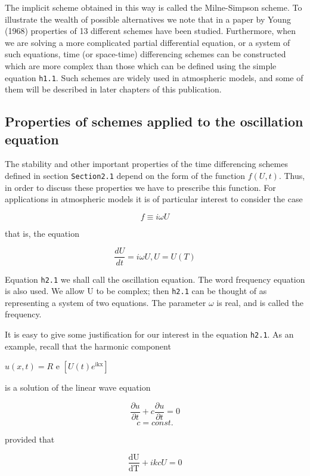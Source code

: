 The implicit scheme obtained in this way is called the Milne-Simpson
scheme. To illustrate the wealth of possible alternatives we note that
in a paper by Young (1968) properties of 13 different schemes have been
studied. Furthermore, when we are solving a more complicated partial
differential equation, or a system of such equations, time (or
space-time) differencing schemes can be constructed which are more
complex than those which can be defined using the simple equation
\texttt{h1.1}. Such schemes are widely used in atmospheric models, and
some of them will be described in later chapters of this publication.

\subsection{\texorpdfstring{\textbf{Properties of schemes applied to the
oscillation
equation}}{Properties of schemes applied to the oscillation equation}}\label{properties-of-schemes-applied-to-the-oscillation-equation}

The stability and other important properties of the time differencing
schemes defined in section \texttt{Section2.1} depend on the form of the
function \(f\left( U,t \right)\). Thus, in order to discuss these
properties we have to prescribe this function. For applications in
atmospheric models it is of particular interest to consider the case

\[f \equiv i\omega U\]

that is, the equation

{\[\frac{dU}{dt} = i\omega U, U = U\left( T \right)\]}

Equation \texttt{h2.1} we shall call the oscillation equation. The word
frequency equation is also used. We allow U to be complex; then
\texttt{h2.1} can be thought of as representing a system of two
equations. The parameter \(\omega\) is real, and is called the
frequency.

It is easy to give some justification for our interest in the equation
\texttt{h2.1}. As an example, recall that the harmonic component

\(u\left( x,t \right) = R\) e
\(\left\lbrack U\left( t \right)e^{\text{ikx}} \right\rbrack\)

is a solution of the linear wave equation

\[\frac{\partial u}{\partial t} + c\frac{\partial u}{\partial t} = 0\]\[c = const.\]

provided that

\[\frac{\text{dU}}{\text{dT}} + ikcU = 0\]

